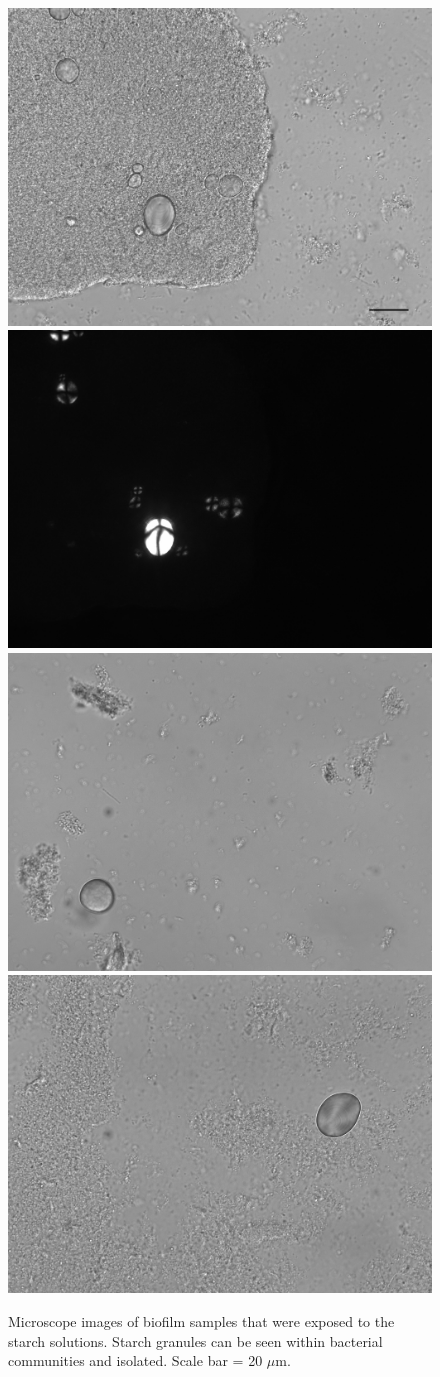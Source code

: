 \documentclass[utf8]{frontiers/frontiersSCNS}
\begin{document}
\begin{figure}[H]

{\centering \includegraphics[width=0.4\linewidth]{../figures/starches_w_bar} \includegraphics[width=0.4\linewidth]{../figures/st2C3.2-mix} \includegraphics[width=0.4\linewidth]{../figures/st1B4-wheat} \includegraphics[width=0.4\linewidth]{../figures/2D2-potato} 

}

\caption{Microscope images of biofilm samples that were exposed to the starch solutions. Starch granules can be seen within bacterial communities and isolated. Scale bar = 20 $\mu$m.}\label{fig:microscope-fig}
\end{figure}
\end{document}
